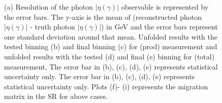 \begin{figure}[ht]
    \hfill
    \hfill
    \hfill
    \hfill


    \caption{(a) Resolution of the photon $|\eta(\gamma)|$ observable is represented by the error bars. The y-axis
    is the mean of (reconstructed photon $|\eta(\gamma)|$ - truth photon $|\eta(\gamma)|$) in GeV and the error bars represent
    one standard deviation around that mean.
    Unfolded results with the tested binning (b) and final
    binning (c) for \tty(prod) measurement and unfolded results with the tested
    (d) and final (e) binning for \tty(total) measurement, The error bar in (b),
    (c), (d), (e) represents statistical uncertainty only.
    The error bar in (b), (c), (d), (e) represents statistical uncertainty only.
    Plots (f)- (i) represents the migration matrix in the SR for above cases.}
\end{figure}
\FloatBarrier

